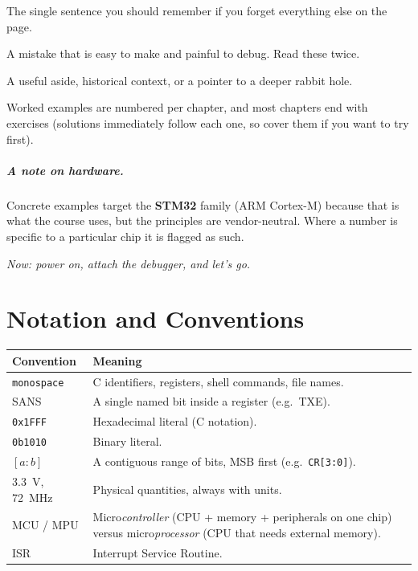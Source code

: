 \documentclass[11pt,a4paper,oneside]{book}
\newcommand{\code}[1]{\texttt{#1}}
\newcommand{\bitname}[1]{\textsf{#1}}
\begin{document}
\begin{keyidea}
The single sentence you should remember if you forget everything else on the page.
\end{keyidea}
\begin{warning}
A mistake that is easy to make and painful to debug. Read these twice.
\end{warning}
\begin{note}
A useful aside, historical context, or a pointer to a deeper rabbit hole.
\end{note}
\noindent Worked examples are numbered per chapter, and most chapters end with
exercises (solutions immediately follow each one, so cover them if you want to
try first).

\paragraph{A note on hardware.}
Concrete examples target the \textbf{STM32} family (ARM Cortex-M) because that
is what the course uses, but the principles are vendor-neutral. Where a number
is specific to a particular chip it is flagged as such.

\vspace{1cm}
\noindent\emph{Now: power on, attach the debugger, and let's go.}

\cleardoublepage
\tableofcontents

\chapter*{Notation and Conventions}

\begin{tabular}{@{}p{4.2cm}p{10.5cm}@{}}
\toprule
\textbf{Convention} & \textbf{Meaning}\\
\midrule
\code{monospace} & C identifiers, registers, shell commands, file names.\\
\bitname{SANS} & A single named bit inside a register (e.g.\ \bitname{TXE}).\\
\code{0x1FFF}   & Hexadecimal literal (C notation).\\
\code{0b1010}   & Binary literal.\\
$[a{:}b]$       & A contiguous range of bits, MSB first (e.g.\ \code{CR[3:0]}).\\
\qty{3.3}{\volt}, \qty{72}{\mega\hertz} & Physical quantities, always with units.\\
MCU / MPU       & Micro\emph{controller} (CPU + memory + peripherals on one chip)
                  versus micro\emph{processor} (CPU that needs external memory).\\
ISR             & Interrupt Service Routine.\\
\bottomrule
\end{tabular}
\end{document}
